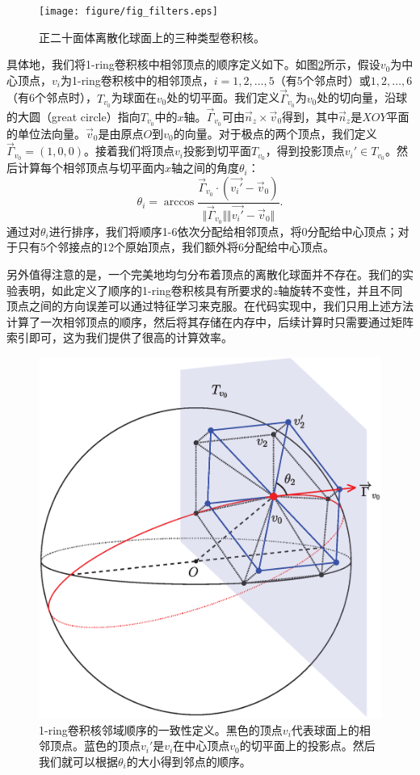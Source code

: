 \begin{figure}[!t]
	\centering
	\texttt{[image: figure/fig\_filters.eps]}
	\caption{正二十面体离散化球面上的三种类型卷积核。}
	\label{fig:fig_filters}
\end{figure}

具体地，我们将1-ring卷积核中相邻顶点的顺序定义如下。如图\ref{fig:figure_1_ring_projection_on_tangent_plane}所示，假设$v_0$为中心顶点，$v_i$为1-ring卷积核中的相邻顶点，$i=1,2,\dots,5$（有5个邻点时）或$1,2,\dots,6$（有6个邻点时），$T_{v_0}$为球面在$v_0$处的切平面。我们定义$\vec{\Gamma}_{v_0}$为$v_0$处的切向量，沿球的大圆（great circle）指向$T_{v_0}$中的$x$轴。$\vec{\Gamma}_{v_0}$可由$\vec{n}_z\times \vec{v}_0$得到，其中$\vec{n}_z$是$XOY$平面的单位法向量。$\vec{v}_0$是由原点$O$到$v_0$的向量。对于极点的两个顶点，我们定义$\vec{\Gamma}_{v_0}=(1,0,0)$。接着我们将顶点$v_i$投影到切平面$T_{v_0}$，得到投影顶点$v_i'\in T_{v_0}$。然后计算每个相邻顶点与切平面内$x$轴之间的角度$\theta_i$：
\begin{equation}
\theta_i=\arccos{\frac{\vec{\Gamma}_{v_0} \cdot (\vec{v_i'}-\vec{v}_0)}{\Vert{\vec{\Gamma}_{v_0}}\Vert\Vert{\vec{v_i'}-\vec{v}_0}\Vert}}.
\end{equation}
通过对$\theta_i$进行排序，我们将顺序1-6依次分配给相邻顶点，将0分配给中心顶点；对于只有5个邻接点的12个原始顶点，我们额外将6分配给中心顶点。

另外值得注意的是，一个完美地均匀分布着顶点的离散化球面并不存在\cite{lee2019spherephd}。我们的实验表明，如此定义了顺序的1-ring卷积核具有所要求的$z$轴旋转不变性，并且不同顶点之间的方向误差可以通过特征学习来克服\cite{lee2019spherephd,liu2018deep,zhao2019spherical_ipmi,jiang2018spherical}。在代码实现中，我们只用上述方法计算了一次相邻顶点的顺序，然后将其存储在内存中，后续计算时只需要通过矩阵索引即可，这为我们提供了很高的计算效率。

\begin{figure}[!t]
	\centering
	\includegraphics[width=0.45\linewidth]{figure/figure_1_ring_projection_on_tangent_plane.eps}
	\caption{1-ring卷积核邻域顺序的一致性定义。黑色的顶点$v_i$代表球面上的相邻顶点。蓝色的顶点$v_i'$是$v_i$在中心顶点$v_0$的切平面上的投影点。然后我们就可以根据$\theta_i$的大小得到邻点的顺序。}
	\label{fig:figure_1_ring_projection_on_tangent_plane}
\end{figure}

